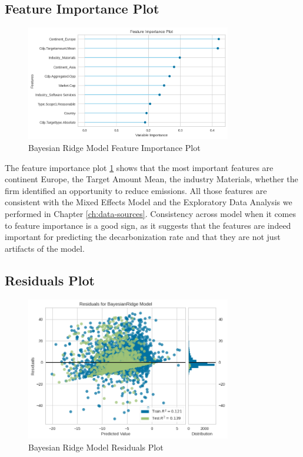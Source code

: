 \subsection{Feature Importance Plot}
\begin{figure}[H]
    \centering
    \includegraphics[width=0.8\textwidth]{figures/Bayes_Importance.png}
    \caption{Bayesian Ridge Model Feature Importance Plot}
    \label{fig:bayesian_ridge_feature_importance}
\end{figure}
The feature importance plot \ref{fig:bayesian_ridge_feature_importance} shows that the most important features are continent Europe, the Target Amount Mean, the industry Materials, whether the firm identified an opportunity to reduce emissions. All those features are consistent with the Mixed Effects Model and the Exploratory Data Analysis we performed in Chapter \ref{ch:data-sources}. Consistency across model when it comes to feature importance is a good sign, as it suggests that the features are indeed important for predicting the decarbonization rate and that they are not just artifacts of the model.

\subsection{Residuals Plot}
\begin{figure}[H]
    \centering
    \includegraphics[width=0.8\textwidth]{figures/Bayes_Residuals.png}
    \caption{Bayesian Ridge Model Residuals Plot}
    \label{fig:bayesian_ridge_residuals}
\end{figure}

